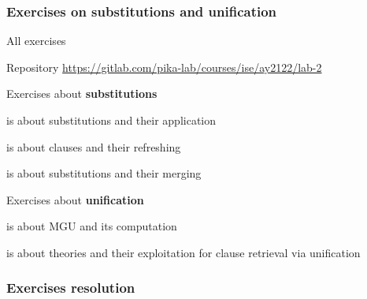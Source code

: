 \documentclass[presentation]{beamer}\mode<presentation>{\usetheme{AMSBolognaFC}}
\begin{document}
\subsubsection{Exercises on substitutions and unification}

\begin{frame}[allowframebreaks]{All exercises}

    \begin{alertblock}{Repository}
        \centering
        \url{https://gitlab.com/pika-lab/courses/ise/ay2122/lab-2}
    \end{alertblock}

    \begin{block}{Exercises about \textbf{substitutions}}
        \label{slide:ex-sub}
        \begin{description}
            \startExercise
            \item[\currentExercise] is about substitutions and their application 
            \startExercise
            \item[\currentExercise] is about clauses and their refreshing
            \startExercise
            \item[\currentExercise] is about substitutions and their merging
        \end{description}
    \end{block}
    \begin{block}{Exercises about \textbf{unification}}
        \label{slide:ex-uni}
        \begin{description}
            \startExercise
            \item[\currentExercise] is about MGU and its computation
            \startExercise
            \item[\currentExercise] is about theories and their exploitation for clause retrieval via unification
        \end{description}
    \end{block}
\end{frame}

\subsubsection{Exercises resolution}
\end{document}
